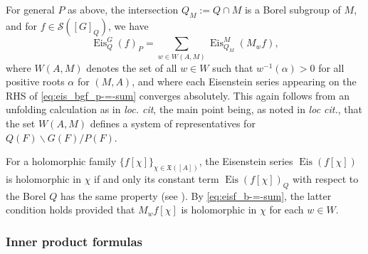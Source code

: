 \documentclass[reqno]{amsart}
\DeclareMathOperator{\Eis}{Eis}
\theoremstyle{plain} \newtheorem{theorem} {Theorem}
\theoremstyle{definition} \newtheorem{definition} [theorem] {Definition}
\theoremstyle{itplain} %
\numberwithin{equation}{section}
\numberwithin{theorem}{section}
\begin{document}
For general $P$ as above, the intersection $Q_{M} := Q \cap M$ is a Borel subgroup of $M$, and for $f \in \mathcal{S}([G]_Q)$, we have
\begin{equation}\label{eq:eis_bgf_p-=-sum}
  \Eis_Q^G(f)_P = \sum _{w \in W(A,M)} \Eis_{Q_{M}}^{M} (M_w f),
\end{equation}
where $W(A,M)$ denotes the set of all $w \in W$ such that $w^{-1}(\alpha) > 0$ for all positive roots $\alpha$ for $(M,A)$, and where each Eisenstein series appearing on the RHS of \eqref{eq:eis_bgf_p-=-sum} converges absolutely.  This again follows from an unfolding calculation as in \emph{loc. cit}, the main point being, as noted in \emph{loc cit.}, that the set $W(A,M)$ defines a system of representatives for $Q(F) \backslash G(F) / P(F)$.

For a holomorphic family $\{f[\chi]\}_{\chi \in \mathfrak{X}([A])}$, the Eisenstein series $\Eis(f[\chi])$ is holomorphic in $\chi$ if and only its constant term $\Eis(f[\chi])_Q$ with respect to the Borel $Q$ has the same property (see \cite[\S I.4.10 and Remark p167]{MR1361168}).  By \eqref{eq:eisf_b-=-sum}, the latter condition holds provided that $M_w f[\chi]$ is holomorphic in $\chi$ for each $w \in W$.

\subsubsection{Inner product formulas}
\end{document}
